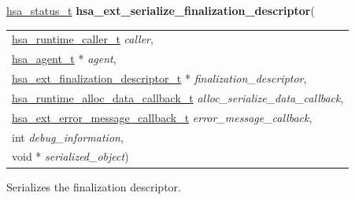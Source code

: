 \documentclass[final]{book}
\newcommand{\hsaarg}[1]{\textit{#1}}
\begin{document}
\noindent\begin{tcolorbox}[breakable,nobeforeafter,colframe=white,colback=lightgray,left=0mm]
\hyperlink{group__status_1gad755322e7ff95456520e8abdbe90d225}{hsa_status_t} \hypertarget{group__FinalizerCoreApi_1ga905013e92cd495d02e723ebcb08247a5}{\textbf{hsa_ext_serialize_finalization_descriptor}}(
\vspace{-3.5mm}\begin{longtable}{@{}p{\textwidth}}
\hspace{1.7em}\hyperlink{group__RuntimeCommon_1ga7d9b1191602415f5dd3893985cc93826}{hsa_runtime_caller_t} \hsaarg{caller},\\
\hspace{1.7em}\hyperlink{group__topology_1gab8db3fb886332a24acac08ec361e1d86}{hsa_agent_t} * \hsaarg{agent},\\
\hspace{1.7em}\hyperlink{group__FinalizerCoreApi_1ga891145420d6ee58bf56b59c557101b88}{hsa_ext_finalization_descriptor_t} * \hsaarg{finalization_descriptor},\\
\hspace{1.7em}\hyperlink{group__RuntimeCommon_1ga30804c05fe32b4ab9da480280dba8cc5}{hsa_runtime_alloc_data_callback_t} \hsaarg{alloc_serialize_data_callback},\\
\hspace{1.7em}\hyperlink{group__FinalizerCoreApi_1gace3d3971c5289675c4f88ce0045db41f}{hsa_ext_error_message_callback_t} \hsaarg{error_message_callback},\\
\hspace{1.7em}int \hsaarg{debug_information},\\
\hspace{1.7em}void * \hsaarg{serialized_object})\end{longtable}

\end{tcolorbox}
Serializes the finalization descriptor.
\end{document}
